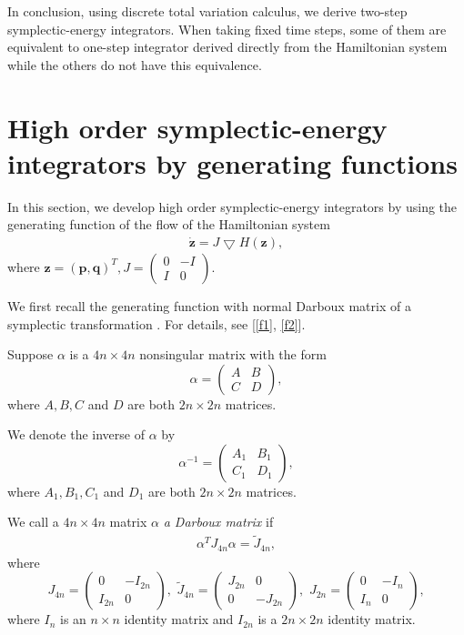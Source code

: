 \documentclass[a4paper,a4paper]{article}
\def\sect#1{\section{#1}\setcounter{equation}{0}}
\def\q{\boldsymbol{q}}
\def\p{\boldsymbol{p}}
\def\z{\boldsymbol{z}}
\begin{document}
In conclusion, using discrete total variation calculus, we derive
two-step symplectic-energy integrators. When taking fixed time
steps, some of them are equivalent to one-step integrator derived
directly from the Hamiltonian system while the others do not have
this equivalence.



\sect{High order symplectic-energy integrators by generating functions}

In this section, we develop high order symplectic-energy integrators by
using the generating function of the flow of the Hamiltonian system
\begin{align}
 \dot{\z}=J\bigtriangledown H(\z), \label{4.1}
\end{align}
where $\z=(\p, \q)^{T}, J=\left(\begin{matrix}0&-I\\I&0\end{matrix}\right)$.

We first recall the generating function with normal Darboux matrix of a symplectic
transformation . For details, see [\ref{f1}, \ref{f2}].

Suppose $\alpha$ is a $4n\times 4n$ nonsingular matrix with the form
\[
    \alpha=\left(\begin{matrix}A&B\\C&D\end{matrix}\right),
\]
where $ A, B, C $ and $D$ are both $2n\times 2n$ matrices.

We denote the inverse of $\alpha$ by
\[
    \alpha^{-1}=\left(\begin{matrix}A_{1}&B_{1}\\C_{1}&D_{1}\end{matrix}\right),
\]
where $ A_{1}, B_{1}, C_{1} $ and $D_{1}$ are both $2n\times 2n$ matrices.

We call a $4n\times 4n$ matrix $\alpha$ {\em  a Darboux matrix} if
\begin{align}
   \alpha^{T}J_{4n}\alpha=\tilde{J}_{4n}, \label{4.2}
\end{align}
where
\[
    J_{4n}=\left(\begin{matrix}0&-I_{2n}\\I_{2n}&0\end{matrix}\right),\,\,
   \tilde{J}_{4n}=\left(\begin{matrix}J_{2n}&0\\0&-J_{2n}\end{matrix}\right),\,\,
   J_{2n}=\left(\begin{matrix}0&-I_{n}\\I_{n}&0\end{matrix}\right),
\]
where $I_{n}$ is an $n\times n$ identity matrix and $I_{2n}$ is a $2n\times 2n$
identity matrix.
\end{document}
